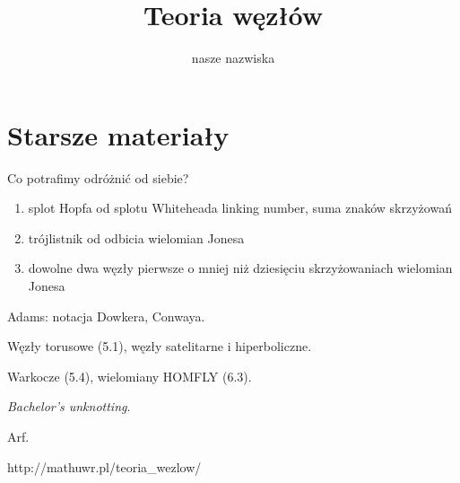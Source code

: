\documentclass[a4paper, fleqn]{extarticle}
\title{Teoria węzłów}
\author{nasze nazwiska}
\numberwithin{dummy}{section}
\begin{document}
\maketitle
\tableofcontents





%







\newpage

\raggedright

\section*{Starsze materiały}

Co potrafimy odróżnić od siebie?
\begin{enumerate}
\item splot Hopfa od splotu Whiteheada \dotfill linking number, suma znaków skrzyżowań
\item trójlistnik od odbicia \dotfill wielomian Jonesa
\item dowolne dwa węzły pierwsze o mniej niż dziesięciu skrzyżowaniach \dotfill  wielomian Jonesa
\end{enumerate}

Adams: notacja Dowkera, Conwaya.

Węzły torusowe (5.1), węzły satelitarne i hiperboliczne.

Warkocze (5.4), wielomiany HOMFLY (6.3).

\emph{Bachelor's unknotting}.

Arf.

http://mathuwr.pl/teoria_wezlow/
\end{document}
